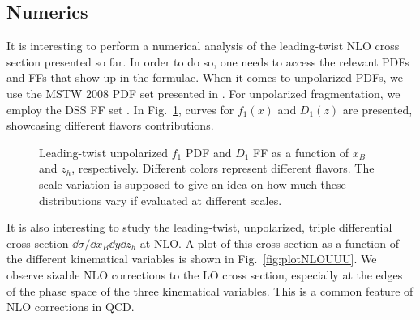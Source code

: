 \subsection{Numerics}
It is interesting to perform a numerical analysis of the leading-twist NLO cross section presented so far. In order to do so, one needs to access the relevant PDFs and FFs that show up in the formulae. When it comes to unpolarized PDFs, we use the MSTW 2008 PDF set presented in \cite{Martin_2009}. For unpolarized fragmentation, we employ the DSS FF set \cite{de_Florian_2007}. In Fig.~\ref{fig:f1D1}, curves for $f_1(x)$ and $D_1(z)$ are presented, showcasing different flavors contributions.
\begin{figure}
    \centering
    \hfill
    \caption{Leading-twist unpolarized $f_1$ PDF and $D_1$ FF as a function of $x_B$ and $z_h$, respectively. Different colors represent different flavors. The scale variation is supposed to give an idea on how much these distributions vary if evaluated at different scales.}
    \label{fig:f1D1}
\end{figure}
It is also interesting to study the leading-twist, unpolarized, triple differential cross section $\dd \sigma/\dd x_B \dd y \dd z_h$ at NLO. A plot of this cross section as a function of the different kinematical variables is shown in Fig.~\ref{fig:plotNLOUUU}. We observe sizable NLO corrections to the LO cross section, especially at the edges of the phase space of the three kinematical variables. This is a common feature of NLO corrections in QCD.
